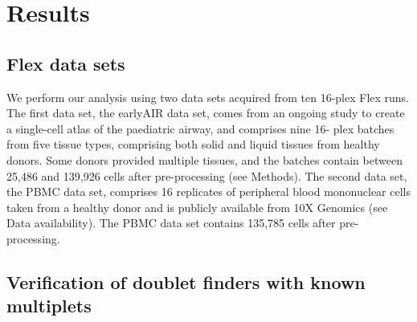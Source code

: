 \documentclass[unnumsec,webpdf,modern,large]{oup-authoring-template}
\begin{document}
	\section{Results}
	\label{sec:results}
	
	\subsection{Flex data sets}
	\label{subsec: data}
	
	We perform our analysis using two data sets acquired from ten 16-plex Flex runs. 
	The first data set, the earlyAIR data set, comes from an ongoing study to create a single-cell atlas of the paediatric airway, and comprises nine 16- plex batches from five tissue types, comprising both solid and liquid tissues from healthy donors. 
	Some donors provided multiple tissues, and the batches contain between 25,486 and 139,926 cells after pre-processing (see Methods). 
	The second data set, the PBMC data set, comprises 16 replicates of peripheral blood mononuclear cells taken from a healthy donor and is publicly available from 10X Genomics (see Data availability).  
	The PBMC data set contains 135,785 cells after pre-processing.
	
	\subsection{Verification of doublet finders with known multiplets}
\end{document}
